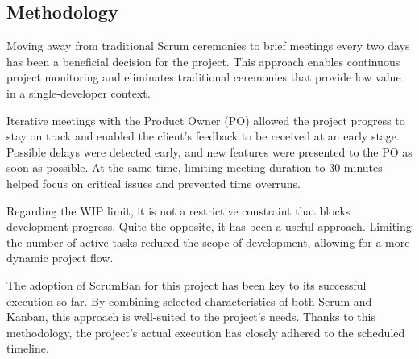 \subsection{Methodology}

Moving away from traditional Scrum ceremonies to brief meetings every two days has been a beneficial decision for the project. This approach enables continuous project monitoring and eliminates traditional ceremonies that provide low value in a single-developer context.

Iterative meetings with the Product Owner (PO) allowed the project progress to stay on track and enabled the client's feedback to be received at an early stage. Possible delays were detected early, and new features were presented to the PO as soon as possible. At the same time, limiting meeting duration to 30 minutes helped focus on critical issues and prevented time overruns.

Regarding the WIP limit, it is not a restrictive constraint that blocks development progress. Quite the opposite, it has been a useful approach. Limiting the number of active tasks reduced the scope of development, allowing for a more dynamic project flow.

The adoption of ScrumBan for this project has been key to its successful execution so far. By combining selected characteristics of both Scrum and Kanban, this approach is well-suited to the project's needs. Thanks to this methodology, the project's actual execution has closely adhered to the scheduled timeline.
